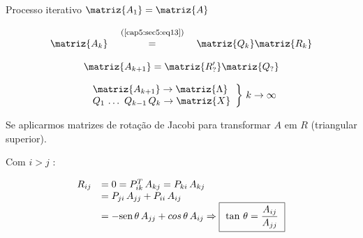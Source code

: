 Processo iterativo $ \matriz{A_1} = \matriz{A} $

\begin{equation}
 \label{cap5:sec5:eq14}
 \begin{array}{rcl}
  & \mbox{ \footnotesize{(\ref{cap5:sec5:eq13})} } & \\
  \matriz{A_k} & = & \matriz{Q_k} \matriz{R_k}
 \end{array}
\end{equation}

\begin{equation}
 \label{cap5:sec5:eq15}
 \matriz{A_{k+1}} = \matriz{R'_?} \matriz{Q_?}
\end{equation}

\[
 \left.
 \begin{array}{l}
  \matriz{A_{k+1}} \rightarrow \matriz{\Lambda} \\
  Q_1 \, \ldots \, \, Q_{k-1} \, Q_k \rightarrow \matriz{X}
 \end{array}
 \right\}
 \, k \rightarrow \infty
\]

Se aplicarmos matrizes de rotação de Jacobi para transformar $ A $ em $ R $ (triangular superior).

Com $ i > j $ :

\[
 \begin{array}{ll}
  R_{ij} & = 0 = P_{ik}^T \, A_{kj} = P_{ki} \, A_{kj}\\
         & = P_{ji} \, A_{jj} + P_{ii} \, A_{ij}\\ \vspace*{0.3cm}
         & = -\mbox{sen} \, \theta \, A_{jj} + cos \, \theta \, A_{ij} \Rightarrow \mbox{\framebox{ $ \tan \, \theta = \displaystyle \frac{A_{ij}}{A_{jj}} $ }}
 \end{array}
% 
% 
\]

